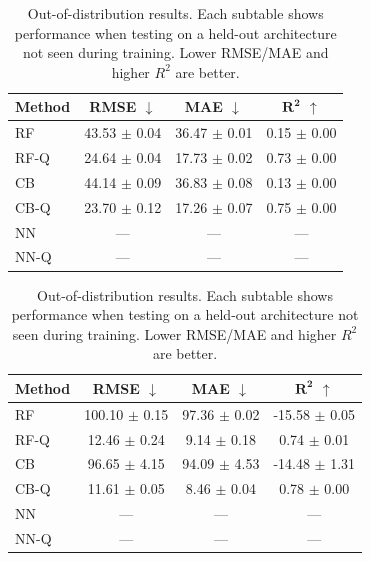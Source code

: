 \begin{table}[t]
    \centering
    \caption{Out-of-distribution results. Each subtable shows performance when testing on a held-out architecture not seen during training. Lower RMSE/MAE and higher $R^2$ are better.}
    \label{tab:ood-results}
    \vspace{0.5em}
    \begin{minipage}{0.48\textwidth}
        \centering
        \label{tab:ood-rtx5000}
        \begin{tabular}{lccc}
            \toprule
            \textbf{Method} & \textbf{RMSE} $\downarrow$ & \textbf{MAE} $\downarrow$ & $\boldsymbol{R^2}$ $\uparrow$ \\
            \midrule
            RF      & 43.53 $\pm$ 0.04 & 36.47 $\pm$ 0.01 & 0.15 $\pm$ 0.00 \\
            RF-Q    & 24.64 $\pm$ 0.04 & 17.73 $\pm$ 0.02 & 0.73 $\pm$ 0.00 \\
            \midrule
            CB      & 44.14 $\pm$ 0.09 & 36.83 $\pm$ 0.08 & 0.13 $\pm$ 0.00 \\
            CB-Q    & 23.70 $\pm$ 0.12 & 17.26 $\pm$ 0.07 & 0.75 $\pm$ 0.00 \\
            \midrule
            NN      & --- & --- & --- \\
            NN-Q    & --- & --- & --- \\
            \bottomrule
        \end{tabular}
    \end{minipage}
    \hfill
    \begin{minipage}{0.48\textwidth}
        \centering
        \label{tab:ood-rtx4000}
        \begin{tabular}{lccc}
            \toprule
            \textbf{Method} & \textbf{RMSE} $\downarrow$ & \textbf{MAE} $\downarrow$ & $\boldsymbol{R^2}$ $\uparrow$ \\
            \midrule
            RF      & 100.10 $\pm$ 0.15 & 97.36 $\pm$ 0.02 & -15.58 $\pm$ 0.05 \\
            RF-Q    & 12.46 $\pm$ 0.24 & 9.14 $\pm$ 0.18 & 0.74 $\pm$ 0.01 \\
            \midrule
            CB      & 96.65 $\pm$ 4.15 & 94.09 $\pm$ 4.53 & -14.48 $\pm$ 1.31 \\
            CB-Q    & 11.61 $\pm$ 0.05 & 8.46 $\pm$ 0.04 & 0.78 $\pm$ 0.00 \\
            \midrule
            NN      & --- & --- & --- \\
            NN-Q    & --- & --- & --- \\
            \bottomrule
        \end{tabular}
    \end{minipage}


\end{table}
